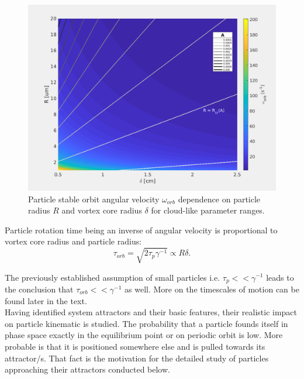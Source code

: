 \documentclass[../main.tex]{subfiles}
\begin{document}
\begin{figure}
\centering
\noindent \includegraphics[width=30pc]{gfx/orbit_vel_vs_R_and_delta.png}
\caption{Particle stable orbit angular velocity $\omega_{orb}$ dependence on particle radius $R$ and vortex core radius $\delta$ for cloud-like parameter ranges.}
\label{fig:ch3_3b}
\end{figure}

Particle rotation time being an inverse of angular velocity is proportional to vortex core radius and particle radius:
\begin{equation}
\tau_{orb}=\sqrt{2 \tau_p \gamma^{-1}} \propto R \delta.
\label{ch3:eq21}
\end{equation}

The previously established assumption of small particles  i.e. $\tau_p<<\gamma^{-1}$ leads to the conclusion that $\tau_{orb}<<\gamma^{-1}$ as well. More on the timescales of motion can be found later in the text.\\
Having identified system attractors and their basic features, their realistic impact on particle kinematic is studied. The probability that a particle founds itself in phase space exactly in the equilibrium point or on periodic orbit is low. More probable is that it is positioned somewhere else and is pulled towards its attractor/s. That fact is the motivation for the detailed study of particles approaching their attractors conducted below.\\
\end{document}
